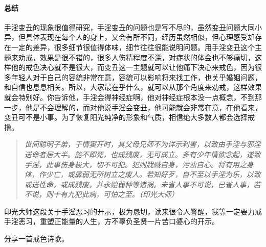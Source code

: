 \paragraph*{总结}

手淫变丑的现象很值得研究，手淫变丑的问题也是写不尽的，虽然变丑问题大同小异，但具体表现在每个人的身上，又会有所不同，经历虽然相似，但心理感受却存在一定的差异，很多细节很值得体味，细节往往很能说明问题。用手淫变丑这个主题来劝戒，效果是很不错的，很多人伤精程度不深，对症状的体会也不够痛切，这样他的戒色决心就不是很大，而变丑这一主题就可以让他痛下决心来戒色，因为很多年轻人对于自己的容貌非常在意，容貌可以影响将来找工作，也关乎婚姻问题，和自信也息息相关。所以，大家最在乎什么，就可以从那个角度来劝戒，这样效果就会特别好。你告诉他，手淫会得神经症啊，他对神经症根本没一点概念，不到那一步，他是不会理解的，而对他说手淫会变丑，他可能就会非常在意，在他看来，变丑可不是小事。为了恢复阳光纯净的形象和气质，相信绝大多数人都会选择戒撸。

\begin{quote}\it
    世间聪明子弟，于情窦开时，其父母兄师不为详示利害，以致由手淫与邪淫送命者居大半。能不即死，也成残废，无可成立。多有少年情欲念起，遂致手淫，此事伤身极大，切不可犯。犯则戕贼自身，污浊自心。将有用之身体，作少亡，或孱弱无所树立之废人。若知好歹，自不至以手淫为乐，以致或送性命，或成残废，并永贻弱种等诸祸。未省人事不可说，已省人事，若不说，则十有九犯此病，可怕之至。（印光大师）
\end{quote}

印光大师这段关于手淫恶习的开示，极为恳切，读来很令人警醒，我等一定要力戒手淫恶习，重塑正能量的人生，方不辜负圣贤一片苦口婆心的开示。

分享一首戒色诗歌。

